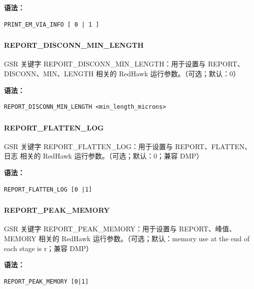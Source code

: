 \textbf{语法：}
\begin{lstlisting}
PRINT_EM_VIA_INFO [ 0 | 1 ]
\end{lstlisting}

\subsubsection{}
\paragraph*{REPORT_DISCONN_MIN_LENGTH}

GSR 关键字 REPORT_DISCONN_MIN_LENGTH：用于设置与 REPORT、DISCONN、MIN、LENGTH 相关的 RedHawk 运行参数。（可选；默认：0）

\textbf{语法：}
\begin{lstlisting}
REPORT_DISCONN_MIN_LENGTH <min_length_microns>
\end{lstlisting}

\subsubsection{}
\paragraph*{REPORT_FLATTEN_LOG}

GSR 关键字 REPORT_FLATTEN_LOG：用于设置与 REPORT、FLATTEN、日志 相关的 RedHawk 运行参数。（可选；默认：0；兼容 DMP）

\textbf{语法：}
\begin{lstlisting}
REPORT_FLATTEN_LOG [0 |1]
\end{lstlisting}

\subsubsection{}
\paragraph*{REPORT_PEAK_MEMORY}

GSR 关键字 REPORT_PEAK_MEMORY：用于设置与 REPORT、峰值、MEMORY 相关的 RedHawk 运行参数。（可选；默认：memory use at the end of each stage is r；兼容 DMP）

\textbf{语法：}
\begin{lstlisting}
REPORT_PEAK_MEMORY [0|1]
\end{lstlisting}

